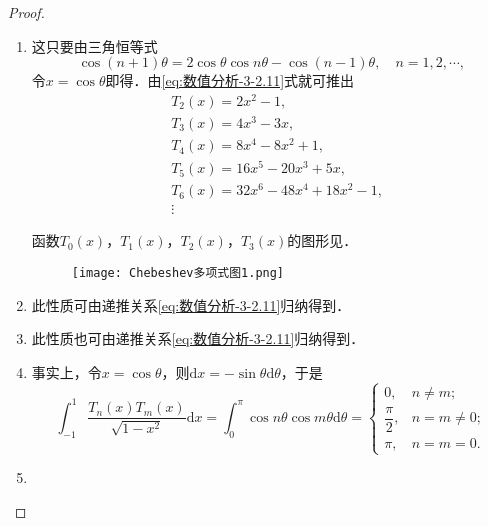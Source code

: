 \documentclass[../../main.tex]{subfiles}
\begin{document}
\begin{proof}
\begin{enumerate}
\item 这只要由三角恒等式
$$\cos(n+1)\theta = 2\cos\theta\cos n\theta - \cos(n-1)\theta,\quad n = 1,2,\cdots,$$
令$x = \cos\theta$即得．由\eqref{eq:数值分析-3-2.11}式就可推出
\begin{align*}
&T_2(x)=2x^2-1,
\\
&T_3(x)=4x^3-3x,
\\
&T_4(x)=8x^4-8x^2+1,
\\
&T_5(x)=16x^5-20x^3+5x,
\\
&T_6(x)=32x^6-48x^4+18x^2-1,
\\
&\vdots 
\end{align*}

函数$T_0(x)$，$T_1(x)$，$T_2(x)$，$T_3(x)$的图形见．
\begin{figure}[H]
\centering
\texttt{[image: Chebeshev多项式图1.png]}
\caption{}
\label{figure:Chebeshev多项式图1}
\end{figure}

\item 此性质可由递推关系\eqref{eq:数值分析-3-2.11}归纳得到．

\item 此性质也可由递推关系\eqref{eq:数值分析-3-2.11}归纳得到．

\item 事实上，令$x = \cos\theta$，则$\mathrm{d}x = -\sin\theta\mathrm{d}\theta$，于是
$$\int_{-1}^1 \frac{T_n(x)T_m(x)}{\sqrt{1 - x^2}}\mathrm{d}x = \int_0^\pi \cos n\theta\cos m\theta\mathrm{d}\theta =
\begin{cases}
0, & n \neq m; \\
\dfrac{\pi}{2}, & n = m \neq 0; \\
\pi, & n = m = 0.
\end{cases}$$

\item 
\end{enumerate}

\end{proof}
\end{document}
